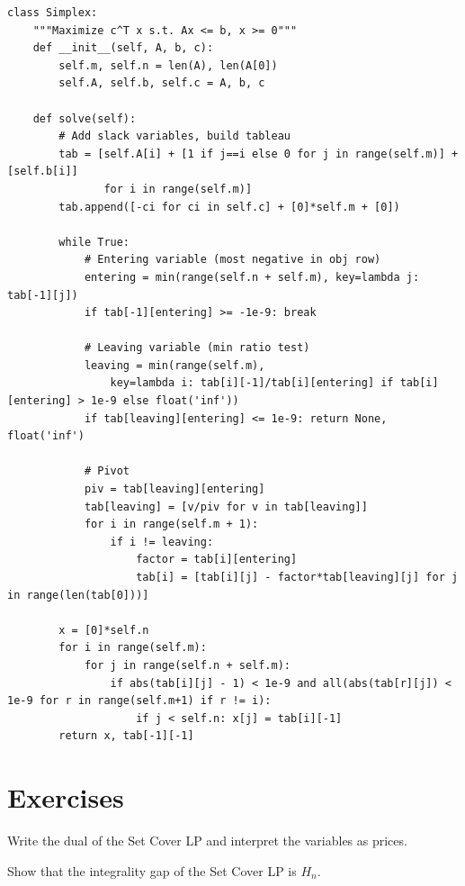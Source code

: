 \begin{lstlisting}[style=python, caption=Simplex for Small LPs]
class Simplex:
    """Maximize c^T x s.t. Ax <= b, x >= 0"""
    def __init__(self, A, b, c):
        self.m, self.n = len(A), len(A[0])
        self.A, self.b, self.c = A, b, c
    
    def solve(self):
        # Add slack variables, build tableau
        tab = [self.A[i] + [1 if j==i else 0 for j in range(self.m)] + [self.b[i]]
               for i in range(self.m)]
        tab.append([-ci for ci in self.c] + [0]*self.m + [0])
        
        while True:
            # Entering variable (most negative in obj row)
            entering = min(range(self.n + self.m), key=lambda j: tab[-1][j])
            if tab[-1][entering] >= -1e-9: break
            
            # Leaving variable (min ratio test)
            leaving = min(range(self.m), 
                key=lambda i: tab[i][-1]/tab[i][entering] if tab[i][entering] > 1e-9 else float('inf'))
            if tab[leaving][entering] <= 1e-9: return None, float('inf')
            
            # Pivot
            piv = tab[leaving][entering]
            tab[leaving] = [v/piv for v in tab[leaving]]
            for i in range(self.m + 1):
                if i != leaving:
                    factor = tab[i][entering]
                    tab[i] = [tab[i][j] - factor*tab[leaving][j] for j in range(len(tab[0]))]
        
        x = [0]*self.n
        for i in range(self.m):
            for j in range(self.n + self.m):
                if abs(tab[i][j] - 1) < 1e-9 and all(abs(tab[r][j]) < 1e-9 for r in range(self.m+1) if r != i):
                    if j < self.n: x[j] = tab[i][-1]
        return x, tab[-1][-1]
\end{lstlisting}

\section{Exercises}
\begin{exercise}
Write the dual of the Set Cover LP and interpret the variables as prices.
\end{exercise}
\begin{exercise}
Show that the integrality gap of the Set Cover LP is $H_n$.
\end{exercise}

